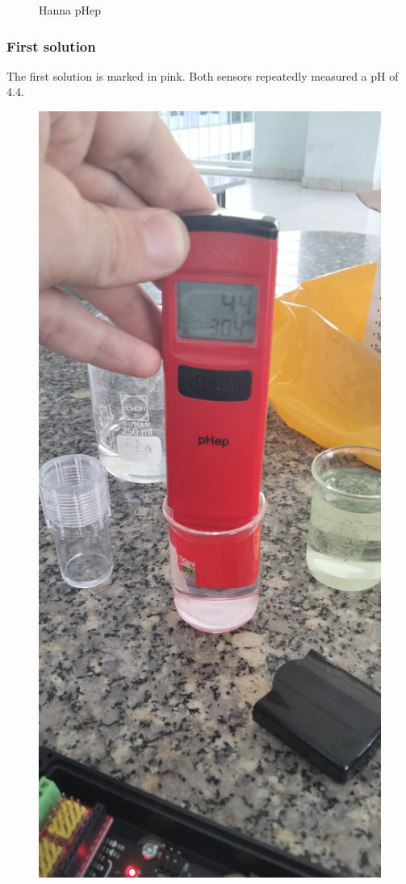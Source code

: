 \begin{figure}[h]
\begin{minipage}[b]{0.3\textwidth}
    \caption{Hanna pHep \cite{hanna}}
  \end{minipage}
\end{figure}

\subsubsection{First solution}
The first solution is marked in pink. Both sensors repeatedly measured a pH of 4.4.

\begin{figure}[h]
  \centering
  \begin{minipage}[b]{0.2\textwidth}
    \includegraphics[width=\textwidth]{sensors/14_ph4_hanna.jpg}

\end{minipage}
\end{figure}
